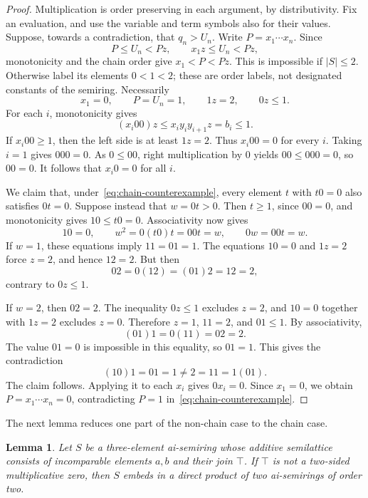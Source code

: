 \documentclass[11pt,reqno]{amsart}
\numberwithin{equation}{section}
\newtheorem{lemma}[theorem]{Lemma}
\theoremstyle{definition}
\theoremstyle{remark}
\begin{document}
\begin{proof}
Multiplication is order preserving in each argument, by distributivity.
Fix an evaluation, and use the variable and term symbols also for
their values. Suppose, towards a contradiction, that $q_n>U_n$.
Write $P=x_1\cdots x_n$. Since
\[
P\leq U_n<Pz,\qquad x_1z\leq U_n<Pz,
\]
monotonicity and the chain order give $x_1<P<Pz$. This is impossible
if $|S|\leq2$. Otherwise label its elements $0<1<2$; these are order
labels, not designated constants of the semiring. Necessarily
\begin{equation}\label{eq:chain-counterexample}
x_1=0,\qquad P=U_n=1,\qquad 1z=2,\qquad 0z\leq1.
\end{equation}
For each $i$, monotonicity gives
\[
(x_i00)z\leq x_i y_i y_{i+1}z=b_i\leq1.
\]
If $x_i00\geq1$, then the left side is at least $1z=2$.
Thus $x_i00=0$ for every $i$. Taking $i=1$ gives $000=0$.
As $0\leq00$, right multiplication by $0$ yields
$00\leq000=0$, so $00=0$. It follows that $x_i0=0$ for all $i$.

We claim that, under~\eqref{eq:chain-counterexample}, every element
$t$ with $t0=0$ also satisfies $0t=0$. Suppose instead that
$w=0t>0$. Then $t\geq1$, since $00=0$, and monotonicity gives
$10\leq t0=0$. Associativity now gives
\[
10=0,\qquad w^2=0(t0)t=00t=w,\qquad 0w=00t=w.
\]
If $w=1$, these equations imply $11=01=1$. The equations
$10=0$ and $1z=2$ force $z=2$, and hence $12=2$.
But then
\[
02=0(12)=(01)2=12=2,
\]
contrary to $0z\leq1$.

If $w=2$, then $02=2$. The inequality $0z\leq1$ excludes $z=2$,
and $10=0$ together with $1z=2$ excludes $z=0$. Therefore
$z=1$, $11=2$, and $01\leq1$. By associativity,
\[
(01)1=0(11)=02=2.
\]
The value $01=0$ is impossible in this equality, so $01=1$.
This gives the contradiction
\[
(10)1=01=1\ne2=11=1(01).
\]
The claim follows. Applying it to each $x_i$ gives $0x_i=0$.
Since $x_1=0$, we obtain $P=x_1\cdots x_n=0$, contradicting
$P=1$ in~\eqref{eq:chain-counterexample}.
\end{proof}

The next lemma reduces one part of the non-chain case to the chain case.

\begin{lemma}\label{lem:flat-quotients}
Let $S$ be a three-element ai-semiring whose additive semilattice
consists of incomparable elements $a,b$ and their join $\top$.
If $\top$ is not a two-sided multiplicative zero, then $S$ embeds
in a direct product of two ai-semirings of order two.
\end{lemma}
\end{document}
